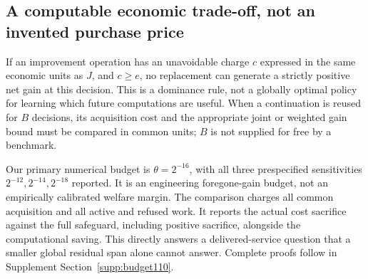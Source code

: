 \subsection{A computable economic trade-off, not an invented purchase price}
If an improvement operation has an unavoidable charge $c$ expressed in the same economic units as $J$, and $c\ge e$, no replacement can generate a strictly positive net gain at this decision. This is a dominance rule, not a globally optimal policy for learning which future computations are useful. When a continuation is reused for $B$ decisions, its acquisition cost and the appropriate joint or weighted gain bound must be compared in common units; $B$ is not supplied for free by a benchmark.

Our primary numerical budget is $\theta=2^{-16}$, with all three prespecified sensitivities $2^{-12},2^{-14},2^{-18}$ reported. It is an engineering foregone-gain budget, not an empirically calibrated welfare margin. The comparison charges all common acquisition and all active and refused work. It reports the actual cost sacrifice against the full safeguard, including positive sacrifice, alongside the computational saving. This directly answers a delivered-service question that a smaller global residual span alone cannot answer. Complete proofs follow in Supplement Section~\ref{supp:budget110}.
